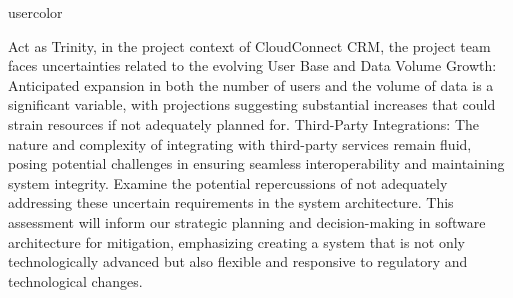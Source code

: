 \begin{chatin}{usercolor}{}

Act as Trinity, in the project context of CloudConnect CRM, the project team faces uncertainties related to the evolving User Base and Data Volume Growth: Anticipated expansion in both the number of users and the volume of data is a significant variable, with projections suggesting substantial increases that could strain resources if not adequately planned for. Third-Party Integrations: The nature and complexity of integrating with third-party services remain fluid, posing potential challenges in ensuring seamless interoperability and maintaining system integrity. Examine the potential repercussions of not adequately addressing these uncertain requirements in the system architecture. This assessment will inform our strategic planning and decision-making in software architecture for mitigation, emphasizing creating a system that is not only technologically advanced but also flexible and responsive to regulatory and technological changes.
\end{chatin}

